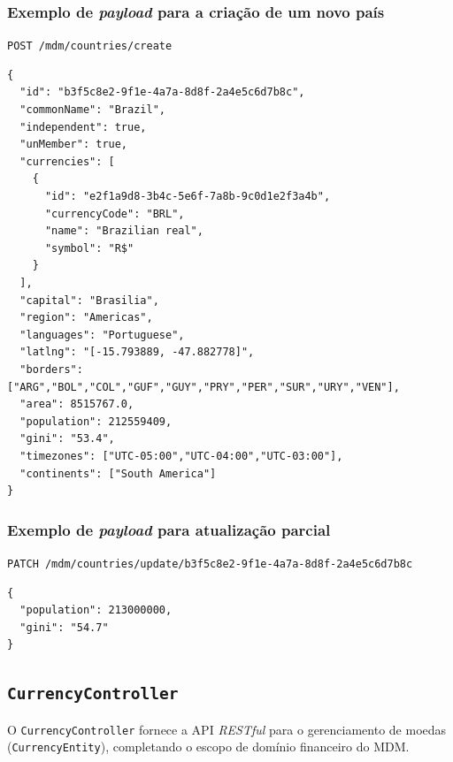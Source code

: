 \documentclass[12pt]{article}
\begin{document}
\subsubsection{Exemplo de \emph{payload} para a criação de um novo país}
\texttt{POST /mdm/countries/create}

\begin{lstlisting}[style=json]
{
  "id": "b3f5c8e2-9f1e-4a7a-8d8f-2a4e5c6d7b8c",
  "commonName": "Brazil",
  "independent": true,
  "unMember": true,
  "currencies": [
    {
      "id": "e2f1a9d8-3b4c-5e6f-7a8b-9c0d1e2f3a4b",
      "currencyCode": "BRL",
      "name": "Brazilian real",
      "symbol": "R$"
    }
  ],
  "capital": "Brasilia",
  "region": "Americas",
  "languages": "Portuguese",
  "latlng": "[-15.793889, -47.882778]",
  "borders": ["ARG","BOL","COL","GUF","GUY","PRY","PER","SUR","URY","VEN"],
  "area": 8515767.0,
  "population": 212559409,
  "gini": "53.4",
  "timezones": ["UTC-05:00","UTC-04:00","UTC-03:00"],
  "continents": ["South America"]
}
\end{lstlisting}

\subsubsection{Exemplo de \emph{payload} para atualização parcial}
\texttt{PATCH /mdm/countries/update/b3f5c8e2-9f1e-4a7a-8d8f-2a4e5c6d7b8c}

\begin{lstlisting}[style=json]
{
  "population": 213000000,
  "gini": "54.7"
}
\end{lstlisting}

\subsection{\texttt{CurrencyController}}
O \texttt{CurrencyController} fornece a API \emph{RESTful} para o gerenciamento de moedas (\texttt{CurrencyEntity}), completando o escopo de domínio financeiro do MDM.
\end{document}
